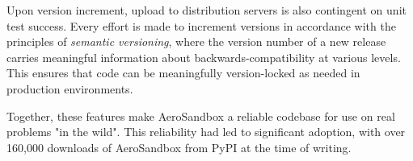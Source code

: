 Upon version increment, upload to distribution servers is also contingent on unit test success. Every effort is made to increment versions in accordance with the principles of \textit{semantic versioning}, where the version number of a new release carries meaningful information about backwards-compatibility at various levels. This ensures that code can be meaningfully version-locked as needed in production environments.

Together, these features make AeroSandbox a reliable codebase for use on real problems "in the wild". This reliability had led to significant adoption, with over 160,000 downloads of AeroSandbox from PyPI at the time of writing.
